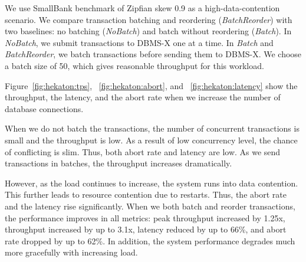 
We use SmallBank benchmark of Zipfian skew 0.9 as a high-data-contention scenario. We compare transaction batching and reordering (\emph{BatchReorder}) with two baselines: no batching (\emph{NoBatch}) and batch without reordering (\emph{Batch}). In \emph{NoBatch}, we submit transactions to DBMS-X one at a time. In \emph{Batch} and \emph{BatchReorder}, we batch transactions before sending them to DBMS-X. We choose a batch size of 50, which gives reasonable throughput for this workload.

Figure~\ref{fig:hekaton:tps}, ~\ref{fig:hekaton:abort}, and ~\ref{fig:hekaton:latency} show the throughput, the latency, and the abort rate when we increase the number of database connections. 
	
When we do not batch the transactions, the number of concurrent transactions is small and the throughput is low. As a result of low concurrency level, the chance of conflicting is slim. Thus, both abort rate and latency are low. As we send transactions in batches, the throughput increases dramatically. 

However, as the load continues to increase, the system runs into data contention. This further leads to resource contention due to restarts. Thus, the abort rate and the latency rise significantly. When we both batch and reorder transactions, the performance improves in all metrics: peak throughput increased by 1.25x, throughput increased by up to 3.1x, latency reduced by up to 66\%, and abort rate dropped by up to 62\%. In addition, the system performance degrades much more gracefully with increasing load.
